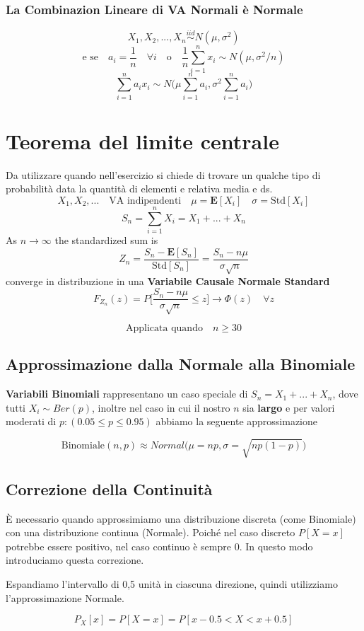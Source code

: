 \subsubsection{La Combinazion Lineare di VA Normali è Normale}
\[X_1,X_2,...,X_n \stackrel{iid}{\sim} N(\mu, \sigma^2)\]
\[\text{e se} \quad a_i = \frac{1}{n} \quad \forall i \quad \text{o} \quad \frac{1}{n} \sum_{i = 1}^n x_i \sim N(\mu, \sigma^2/n)\]
\[\sum_{i = 1}^n a_ix_i \sim N\Big(\mu\sum_{i = 1}^n a_i, \sigma^2\sum_{i = 1}^n a_i\Big)\]

\section{Teorema del limite centrale}
Da utilizzare quando nell'esercizio si chiede di trovare un qualche tipo di probabilità data la quantità di elementi e relativa media e ds.
\[X_1,X_2,... \quad \text{VA indipendenti} \quad \mu = \mathbf{E}[X_i] \quad \sigma = \text{Std}[X_i]\]
\[S_n = \sum_{i = 1}^n X_i = X_1 + ... + X_n\]
As \(n \rightarrow \infty\) the standardized sum is
\[Z_n = \frac{S_n - \mathbf{E}[S_n]}{\text{Std}[S_n]} = \frac{S_n - n\mu}{\sigma\sqrt{n}}\]
converge in distribuzione in una \textbf{Variabile Causale Normale Standard}
\[F_{Z_n}(z) = P\Big[\frac{S_n - n\mu}{\sigma\sqrt{n}} \leq z\Big] \rightarrow \Phi(z) \quad \forall z\]
\begin{tcolorbox}
\[\text{Applicata quando} \quad n \geq 30\]
\end{tcolorbox}

\subsection{Approssimazione dalla Normale alla  Binomiale}
\begin{tcolorbox}
\textbf{Variabili Binomiali} rappresentano un caso speciale di \(S_n = X_1+...+X_n\), dove tutti \(X_i \sim Ber(p)\), inoltre nel caso in cui il nostro \(n\) sia \textbf {largo} e per valori moderati di \(p: (0.05 \leq p \leq 0.95)\) abbiamo la seguente approssimazione
\end{tcolorbox}
\[\text{Binomiale}(n,p) \approx Normal\Big(\mu = np, \sigma = \sqrt{np(1 - p)}\Big)\]

\subsection{Correzione della Continuità}
\begin{tcolorbox}
È necessario quando approssimiamo una distribuzione discreta (come Binomiale) con una distribuzione continua (Normale). Poiché nel caso discreto \(P[X = x]\) potrebbe essere positivo, nel caso continuo è sempre \(0\). In questo modo introduciamo questa correzione.

Espandiamo l'intervallo di 0,5 unità in ciascuna direzione, quindi utilizziamo l'approssimazione Normale.
\end{tcolorbox}
\[P_X[x] = P[X = x] = P[x - 0.5 < X < x + 0.5]\]

